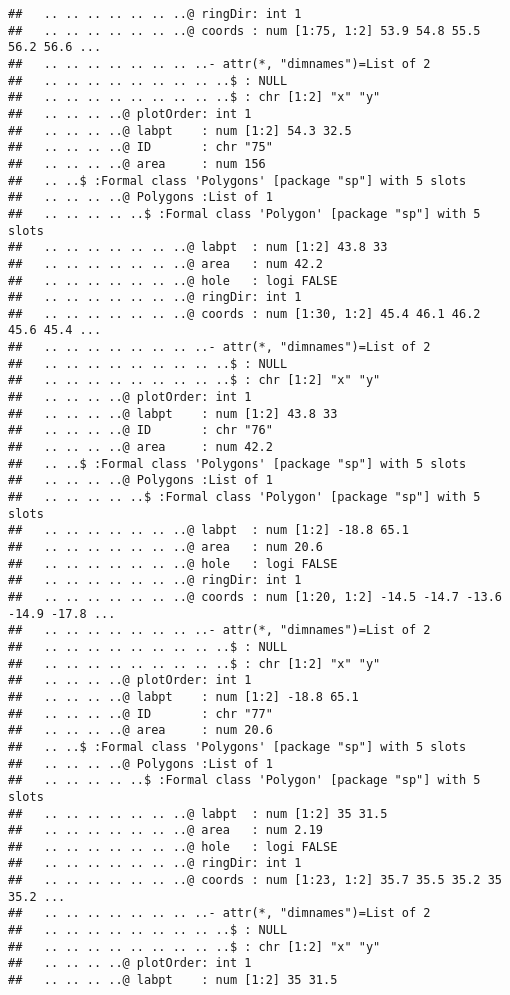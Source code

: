 \documentclass[]{article}
\begin{document}
\begin{verbatim}
##   .. .. .. .. .. .. ..@ ringDir: int 1
##   .. .. .. .. .. .. ..@ coords : num [1:75, 1:2] 53.9 54.8 55.5 56.2 56.6 ...
##   .. .. .. .. .. .. .. ..- attr(*, "dimnames")=List of 2
##   .. .. .. .. .. .. .. .. ..$ : NULL
##   .. .. .. .. .. .. .. .. ..$ : chr [1:2] "x" "y"
##   .. .. .. ..@ plotOrder: int 1
##   .. .. .. ..@ labpt    : num [1:2] 54.3 32.5
##   .. .. .. ..@ ID       : chr "75"
##   .. .. .. ..@ area     : num 156
##   .. ..$ :Formal class 'Polygons' [package "sp"] with 5 slots
##   .. .. .. ..@ Polygons :List of 1
##   .. .. .. .. ..$ :Formal class 'Polygon' [package "sp"] with 5 slots
##   .. .. .. .. .. .. ..@ labpt  : num [1:2] 43.8 33
##   .. .. .. .. .. .. ..@ area   : num 42.2
##   .. .. .. .. .. .. ..@ hole   : logi FALSE
##   .. .. .. .. .. .. ..@ ringDir: int 1
##   .. .. .. .. .. .. ..@ coords : num [1:30, 1:2] 45.4 46.1 46.2 45.6 45.4 ...
##   .. .. .. .. .. .. .. ..- attr(*, "dimnames")=List of 2
##   .. .. .. .. .. .. .. .. ..$ : NULL
##   .. .. .. .. .. .. .. .. ..$ : chr [1:2] "x" "y"
##   .. .. .. ..@ plotOrder: int 1
##   .. .. .. ..@ labpt    : num [1:2] 43.8 33
##   .. .. .. ..@ ID       : chr "76"
##   .. .. .. ..@ area     : num 42.2
##   .. ..$ :Formal class 'Polygons' [package "sp"] with 5 slots
##   .. .. .. ..@ Polygons :List of 1
##   .. .. .. .. ..$ :Formal class 'Polygon' [package "sp"] with 5 slots
##   .. .. .. .. .. .. ..@ labpt  : num [1:2] -18.8 65.1
##   .. .. .. .. .. .. ..@ area   : num 20.6
##   .. .. .. .. .. .. ..@ hole   : logi FALSE
##   .. .. .. .. .. .. ..@ ringDir: int 1
##   .. .. .. .. .. .. ..@ coords : num [1:20, 1:2] -14.5 -14.7 -13.6 -14.9 -17.8 ...
##   .. .. .. .. .. .. .. ..- attr(*, "dimnames")=List of 2
##   .. .. .. .. .. .. .. .. ..$ : NULL
##   .. .. .. .. .. .. .. .. ..$ : chr [1:2] "x" "y"
##   .. .. .. ..@ plotOrder: int 1
##   .. .. .. ..@ labpt    : num [1:2] -18.8 65.1
##   .. .. .. ..@ ID       : chr "77"
##   .. .. .. ..@ area     : num 20.6
##   .. ..$ :Formal class 'Polygons' [package "sp"] with 5 slots
##   .. .. .. ..@ Polygons :List of 1
##   .. .. .. .. ..$ :Formal class 'Polygon' [package "sp"] with 5 slots
##   .. .. .. .. .. .. ..@ labpt  : num [1:2] 35 31.5
##   .. .. .. .. .. .. ..@ area   : num 2.19
##   .. .. .. .. .. .. ..@ hole   : logi FALSE
##   .. .. .. .. .. .. ..@ ringDir: int 1
##   .. .. .. .. .. .. ..@ coords : num [1:23, 1:2] 35.7 35.5 35.2 35 35.2 ...
##   .. .. .. .. .. .. .. ..- attr(*, "dimnames")=List of 2
##   .. .. .. .. .. .. .. .. ..$ : NULL
##   .. .. .. .. .. .. .. .. ..$ : chr [1:2] "x" "y"
##   .. .. .. ..@ plotOrder: int 1
##   .. .. .. ..@ labpt    : num [1:2] 35 31.5

\end{verbatim}
\end{document}
